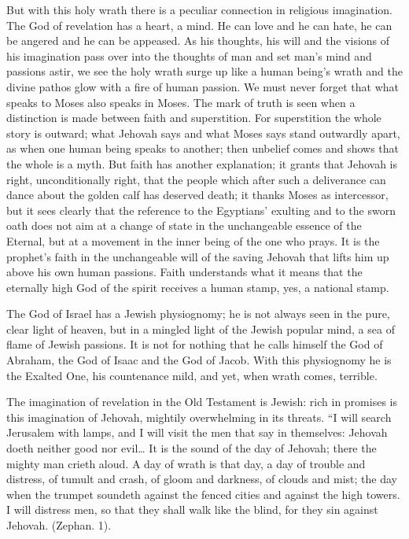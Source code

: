 \documentclass[12pt,a4paper,openany]{book}
\newcommand{\opage}[1]{\marginnote{\footnotesize\textit{[#1]}}}
\begin{document}
But with this holy wrath there is a peculiar connection in religious imagination. The God of revelation has a heart, a mind. He can love and he can hate, he can be angered and he can be appeased. As his thoughts, his will and the visions of his imagination pass over into the thoughts of man and set man's mind and passions astir, we see the holy wrath surge up like a human being's wrath and the divine pathos glow with a fire of human passion. We must never forget that what speaks to Moses also speaks in Moses. The mark of truth is seen when a distinction is made between faith and superstition. For superstition the whole story is outward; what Jehovah says and what Moses says stand outwardly apart, as when one human being speaks to another; then unbelief comes and shows that the whole is a myth. But faith has another explanation; it grants that Jehovah is right, unconditionally right, that the people which after such a deliverance can dance about the golden calf has deserved death; it thanks Moses as intercessor, but it sees clearly that the reference to the Egyptians' exulting and to the sworn oath does not aim at a change of state in the unchangeable essence of the Eternal, but at a movement in the inner being of the one who prays. It is the prophet's faith in the unchangeable will of the saving Jehovah that lifts him up above his own human passions. Faith understands what it means that the eternally high God of the spirit receives a human stamp, yes, a national stamp.

The God of Israel has a Jewish physiognomy; he is not always seen in the pure, clear light of heaven, but in a %
\setcounter{footnote}{0}%
\opage{56}mingled light of the Jewish popular mind, a sea of flame of Jewish passions. It is not for nothing that he calls himself the God of Abraham, the God of Isaac and the God of Jacob. With this physiognomy he is the Exalted One, his countenance mild, and yet, when wrath comes, terrible.

The imagination of revelation in the Old Testament is Jewish: rich in promises is this imagination of Jehovah, mightily overwhelming in its threats. ``I will search Jerusalem with lamps, and I will visit the men that say in themselves: Jehovah doeth neither good nor evil\dots{} It is the sound of the day of Jehovah; there the mighty man crieth aloud. A day of wrath is that day, a day of trouble and distress, of tumult and crash, of gloom and darkness, of clouds and mist; the day when the trumpet soundeth against the fenced cities and against the high towers. I will distress men, so that they shall walk like the blind, for they sin against Jehovah. (Zephan. 1).
\end{document}
